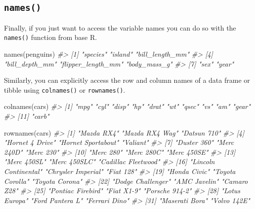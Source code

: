 \documentclass[
  12pt,
]{book}
\newenvironment{Shaded}{\begin{snugshade}}{\end{snugshade}}
\newcommand{\CommentTok}[1]{\textcolor[rgb]{0.56,0.35,0.01}{\textit{#1}}}
\newcommand{\FunctionTok}[1]{\textcolor[rgb]{0.00,0.00,0.00}{#1}}
\newcommand{\NormalTok}[1]{#1}
\begin{document}
\hypertarget{names}{%
\subsection{\texorpdfstring{\texttt{names()}}{names()}}\label{names}}

Finally, if you just want to access the variable names you can do so with the \texttt{names()} function from base R.

\begin{Shaded}
\begin{Highlighting}[]
\FunctionTok{names}\NormalTok{(penguins)}
\CommentTok{\#\textgreater{} [1] "species"           "island"            "bill\_length\_mm"   }
\CommentTok{\#\textgreater{} [4] "bill\_depth\_mm"     "flipper\_length\_mm" "body\_mass\_g"      }
\CommentTok{\#\textgreater{} [7] "sex"               "year"}
\end{Highlighting}
\end{Shaded}

Similarly, you can explicitly access the row and column names of a data frame or tibble using \texttt{colnames()} or \texttt{rownames()}.

\begin{Shaded}
\begin{Highlighting}[]
\FunctionTok{colnames}\NormalTok{(cars)}
\CommentTok{\#\textgreater{}  [1] "mpg"  "cyl"  "disp" "hp"   "drat" "wt"   "qsec" "vs"   "am"   "gear"}
\CommentTok{\#\textgreater{} [11] "carb"}
\end{Highlighting}
\end{Shaded}

\begin{Shaded}
\begin{Highlighting}[]
\FunctionTok{rownames}\NormalTok{(cars)}
\CommentTok{\#\textgreater{}  [1] "Mazda RX4"           "Mazda RX4 Wag"       "Datsun 710"         }
\CommentTok{\#\textgreater{}  [4] "Hornet 4 Drive"      "Hornet Sportabout"   "Valiant"            }
\CommentTok{\#\textgreater{}  [7] "Duster 360"          "Merc 240D"           "Merc 230"           }
\CommentTok{\#\textgreater{} [10] "Merc 280"            "Merc 280C"           "Merc 450SE"         }
\CommentTok{\#\textgreater{} [13] "Merc 450SL"          "Merc 450SLC"         "Cadillac Fleetwood" }
\CommentTok{\#\textgreater{} [16] "Lincoln Continental" "Chrysler Imperial"   "Fiat 128"           }
\CommentTok{\#\textgreater{} [19] "Honda Civic"         "Toyota Corolla"      "Toyota Corona"      }
\CommentTok{\#\textgreater{} [22] "Dodge Challenger"    "AMC Javelin"         "Camaro Z28"         }
\CommentTok{\#\textgreater{} [25] "Pontiac Firebird"    "Fiat X1{-}9"           "Porsche 914{-}2"      }
\CommentTok{\#\textgreater{} [28] "Lotus Europa"        "Ford Pantera L"      "Ferrari Dino"       }
\CommentTok{\#\textgreater{} [31] "Maserati Bora"       "Volvo 142E"}
\end{Highlighting}
\end{Shaded}
\end{document}

